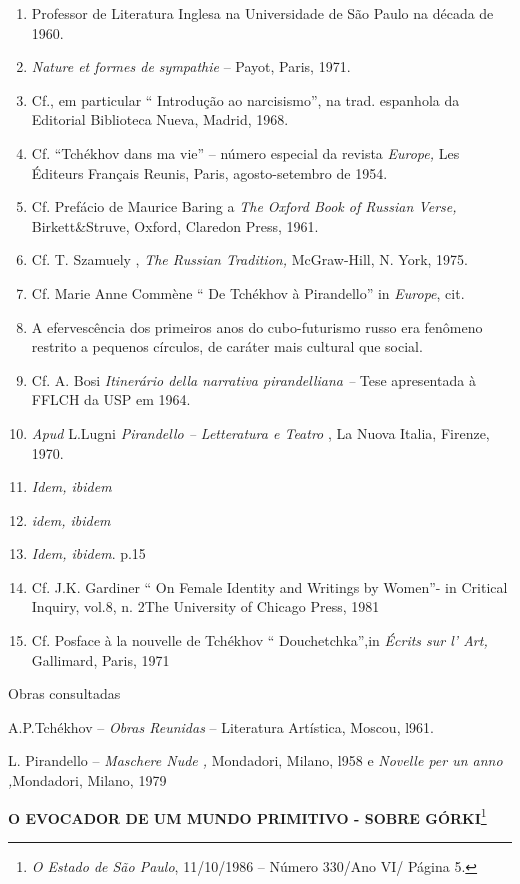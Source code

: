 \begin{enumerate}
\def\labelenumi{\arabic{enumi}.}
\item
  Professor de Literatura Inglesa na Universidade de São Paulo na década
  de 1960.
\item
  \emph{Nature et formes de sympathie} -- Payot, Paris, 1971.
\item
  Cf., em particular `` Introdução ao narcisismo'', na trad. espanhola
  da Editorial Biblioteca Nueva, Madrid, 1968.
\item
  Cf. ``Tchékhov dans ma vie'' -- número especial da revista
  \emph{Europe,} Les Éditeurs Français Reunis, Paris, agosto-setembro de
  1954.
\item
  Cf. Prefácio de Maurice Baring a \emph{The Oxford Book of Russian
  Verse,} Birkett\&Struve, Oxford, Claredon Press, 1961.
\item
  Cf. T. Szamuely , \emph{The Russian Tradition,} McGraw-Hill, N. York,
  1975.
\item
  Cf. Marie Anne Commène `` De Tchékhov à Pirandello'' in \emph{Europe},
  cit.
\item
  A efervescência dos primeiros anos do cubo-futurismo russo era
  fenômeno restrito a pequenos círculos, de caráter mais cultural que
  social.
\item
  Cf. A. Bosi \emph{Itinerário della narrativa pirandelliana --} Tese
  apresentada à FFLCH da USP em 1964.
\item
  \emph{Apud} L.Lugni \emph{Pirandello -- Letteratura e Teatro} , La
  Nuova Italia, Firenze, 1970.
\item
  \emph{Idem, ibidem}
\item
  \emph{idem, ibidem}
\item
  \emph{Idem, ibidem}. p.15
\item
  Cf. J.K. Gardiner `` On Female Identity and Writings by Women''- in
  Critical Inquiry, vol.8, n. 2The \textbar{}University of Chicago
  Press, 1981
\item
  Cf. Posface à la nouvelle de Tchékhov `` Douchetchka'',in \emph{Écrits
  sur l' Art,} Gallimard, Paris, 1971
\end{enumerate}

Obras consultadas

A.P.Tchékhov -- \emph{Obras Reunidas} -- Literatura Artística, Moscou,
l961.

L. Pirandello -- \emph{Maschere Nude ,} Mondadori, Milano, l958 e
\emph{Novelle per un anno ,}Mondadori, Milano, 1979

\textbf{O EVOCADOR DE UM MUNDO PRIMITIVO - SOBRE GÓRKI}\footnote{\emph{O
  Estado de São Paulo}, 11/10/1986 -- Número 330/Ano VI/ Página 5.}

